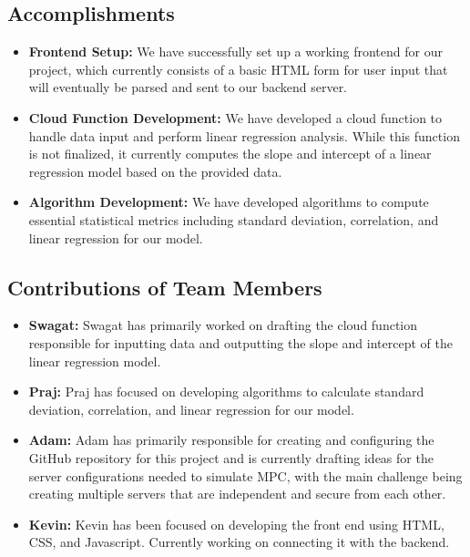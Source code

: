\documentclass[conference]{IEEEtran}
\begin{document}
\subsection*{Accomplishments}

\begin{itemize}
    \item \textbf{Frontend Setup:} We have successfully set up a working frontend for our project, which currently consists of a basic HTML form for user input that will eventually be parsed and sent to our backend server. 
    
    \item \textbf{Cloud Function Development:} We have developed a cloud function to handle data input and perform linear regression analysis. While this function is not finalized, it currently computes the slope and intercept of a linear regression model based on the provided data. 
    
    \item \textbf{Algorithm Development:} We have developed algorithms to compute essential statistical metrics including standard deviation, correlation, and linear regression for our model.~\cite{MPC1}
\end{itemize}

\subsection*{Contributions of Team Members}

\begin{itemize}
    \item \textbf{Swagat:} Swagat has primarily worked on drafting the cloud function responsible for inputting data and outputting the slope and intercept of the linear regression model.
    
    \item \textbf{Praj:} Praj has focused on developing algorithms to calculate standard deviation, correlation, and linear regression for our model.

    \item \textbf{Adam:} Adam has primarily responsible for creating and configuring the GitHub repository for this project and is currently drafting ideas for the server configurations needed to simulate MPC, with the main challenge being creating multiple servers that are independent and secure from each other. 
    
    \item \textbf{Kevin:} Kevin has been focused on developing the front end using HTML, CSS, and Javascript. Currently working on connecting it with the backend. 
\end{itemize}
\end{document}
